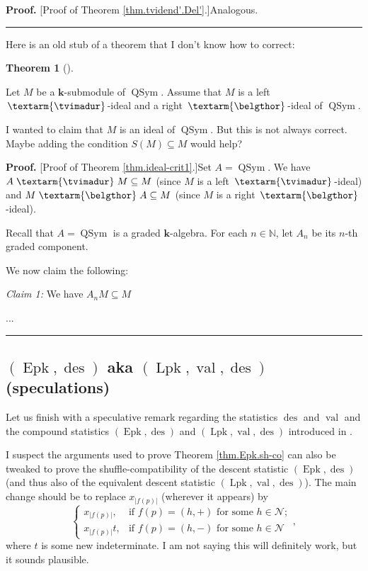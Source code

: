 \documentclass[numbers=enddot,12pt,final,onecolumn,notitlepage]{scrartcl}%
\theoremstyle{definition}
\newtheorem{theo}{Theorem}[section]
\newenvironment{theorem}[1][]
{\begin{theo}[#1]\begin{leftbar}}
{\end{leftbar}\end{theo}}
\newenvironment{proof}[1][Proof]{\noindent\textbf{#1.} }{\ \rule{0.5em}{0.5em}}
\newenvironment{noncompile}{}{}
\newcommand{\tvi}{\left. \textarm{\tvimadur} \right.}
\newcommand{\bel}{\left. \textarm{\belgthor} \right.}
\begin{document}
\begin{noncompile}
\begin{proof}
[Proof of Theorem \ref{thm.tvidend'.Del'}.]Analogous.
\end{proof}

Here is an old stub of a theorem that I don't know how to correct:

\begin{theorem}
\label{thm.ideal-crit1}Let $M$ be a $\mathbf{k}$-submodule of
$\operatorname*{QSym}$. Assume that $M$ is a left $\tvi$-ideal and a right
$\bel$-ideal of $\operatorname*{QSym}$.

I wanted to claim that $M$ is an ideal of $\operatorname*{QSym}$. But this is
not always correct. Maybe adding the condition $S\left(  M\right)  \subseteq
M$ would help?
\end{theorem}

\begin{proof}
[Proof of Theorem \ref{thm.ideal-crit1}.]Set $A=\operatorname*{QSym}$. We have
$A\tvi M\subseteq M$ (since $M$ is a left $\tvi$-ideal) and $M\bel A\subseteq
M$ (since $M$ is a right $\bel$-ideal).

Recall that $A=\operatorname*{QSym}$ is a graded $\mathbf{k}$-algebra. For
each $n\in\mathbb{N}$, let $A_{n}$ be its $n$-th graded component.

We now claim the following:

\textit{Claim 1:} We have $A_{n}M\subseteq M$

...
\end{proof}
\end{noncompile}

\subsection{$\left(  \operatorname*{Epk},\operatorname*{des}\right)  $ aka
$\left(  \operatorname*{Lpk},\operatorname*{val},\operatorname*{des}\right)  $
(speculations)}

Let us finish with a speculative remark regarding the statistics
$\operatorname*{des}$ and $\operatorname*{val}$ and the compound statistics
$\left(  \operatorname*{Epk},\operatorname*{des}\right)  $ and $\left(
\operatorname*{Lpk},\operatorname*{val},\operatorname*{des}\right)  $
introduced in \cite{part1}.

I suspect the arguments used to prove Theorem \ref{thm.Epk.sh-co} can also be
tweaked to prove the shuffle-compatibility of the descent statistic $\left(
\operatorname*{Epk},\operatorname*{des}\right)  $ (and thus also of the
equivalent descent statistic $\left(  \operatorname*{Lpk},\operatorname*{val}%
,\operatorname*{des}\right)  $). The main change should be to replace
$x_{\left\vert f\left(  p\right)  \right\vert }$ (wherever it appears) by%
\[%
\begin{cases}
x_{\left\vert f\left(  p\right)  \right\vert }, & \text{if }f\left(  p\right)
=\left(  h,+\right)  \text{ for some }h\in\mathcal{N};\\
x_{\left\vert f\left(  p\right)  \right\vert }t, & \text{if }f\left(
p\right)  =\left(  h,-\right)  \text{ for some }h\in\mathcal{N}%
\end{cases}
,
\]
where $t$ is some new indeterminate. I am not saying this will definitely
work, but it sounds plausible.
\end{document}
